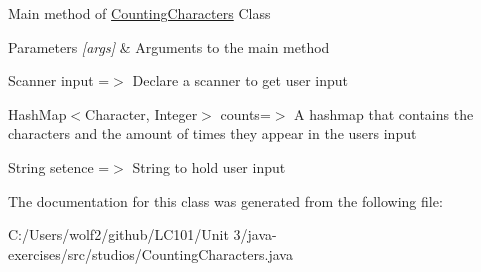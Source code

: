 Main method of \mbox{\hyperlink{classstudios_1_1_counting_characters}{Counting\+Characters}} Class 
\begin{DoxyParams}{Parameters}
{\em \mbox{[}args\mbox{]}} & Arguments to the main method \\
\hline
\end{DoxyParams}
Scanner input =$>$ Declare a scanner to get user input

Hash\+Map$<$\+Character, Integer$>$ counts=$>$ A hashmap that contains the characters and the amount of times they appear in the user\textquotesingle{}s input

String setence =$>$ String to hold user input 

The documentation for this class was generated from the following file\+:\begin{DoxyCompactItemize}
\item 
C\+:/\+Users/wolf2/github/\+L\+C101/\+Unit 3/java-\/exercises/src/studios/Counting\+Characters.\+java\end{DoxyCompactItemize}
